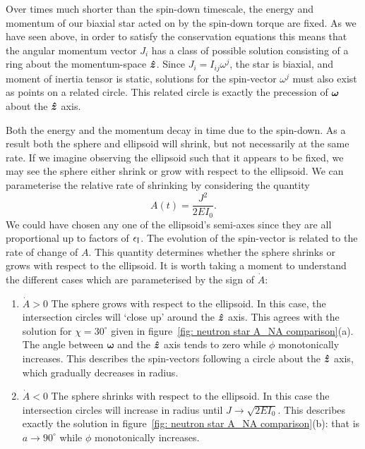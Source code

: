 \documentclass[../full_thesis/full_thesis.tex]{subfiles}
\begin{document}
Over times much shorter than the spin-down timescale, the energy and momentum
of our biaxial star acted on by the spin-down torque are fixed. As we have seen
above, in order to satisfy the conservation equations this means that the
angular momentum vector $J_i$ has a class of possible solution consisting of a
ring about the momentum-space $\boldsymbol{\hat{z}}$.  Since $J_{i}=I_{ij}\omega^{j}$, the star
is biaxial, and moment of inertia tensor is static, solutions for the spin-vector $\omega^j$
must also exist as points on a related circle. This related circle is exactly
the precession of $\boldsymbol{\omega}$ about the $\boldsymbol{\hat{z}}$ axis.

Both the energy and the momentum decay in time
due to the spin-down. As a result both the sphere and ellipsoid will shrink, but
not necessarily at the same rate. If we imagine observing the ellipsoid such
that it appears to be fixed, we may see the sphere either shrink or grow with
respect to the ellipsoid. We can parameterise the relative rate of shrinking by
considering the quantity
\begin{equation}
A(t)  = \frac{J^{2}} {2EI_{0}}.
\label{eqn: A}
\end{equation}
We could have chosen any one of the ellipsoid's semi-axes since they are all
proportional up to factors of $\epsilon_{\mathrm{I}}$. The evolution of the spin-vector is
related to the rate of change of $A$.
This quantity determines whether the sphere shrinks or grows with respect to
the ellipsoid. It is worth taking a moment to understand the different cases
which are parameterised by the sign of $\dot{A}$:
\begin{enumerate}
\item $\dot{A}>0$ The sphere grows with respect to the ellipsoid. In this case,
    the intersection circles will `close up' around the $\boldsymbol{\hat{z}}$ axis. This
    agrees with the solution for $\chi=30^{\circ}$ given in
    figure~\ref{fig: neutron star A_NA comparison}(a). The angle between
    $\boldsymbol{\omega}$ and the $\boldsymbol{\hat{z}}$ axis tends to zero while $\phi$
    monotonically increases. This describes the spin-vectors following a circle
    about the $\boldsymbol{\hat{z}}$ axis, which gradually decreases in radius.
\item $\dot{A}<0$ The sphere shrinks with respect to the ellipsoid. In this
    case the intersection circles will increase in radius until $J\rightarrow
    \sqrt{2EI_{0}}$. This describes exactly the solution in
    figure~\ref{fig: neutron star A_NA comparison}(b): that is $a\rightarrow
    90^{\circ}$ while $\phi$ monotonically increases.
\end{enumerate}
\end{document}
